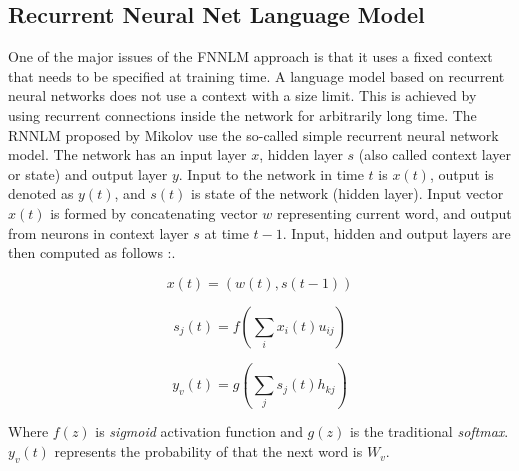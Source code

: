 

\subsection{Recurrent Neural Net Language Model}

One of the major issues of the \ac{FNNLM} approach is that
it uses a fixed context that needs to be specified at training time.
A language model based on recurrent neural networks  does not use a context
with a size limit. This is achieved by  using recurrent connections inside the network for arbitrarily long time. The \ac{RNNLM} proposed by
Mikolov use the so-called simple 
recurrent neural network model. The network has an input layer $x$, hidden
layer $s$ (also called context layer or state) and output layer $y$. Input to
the network in time $t$ is $x(t)$, output is denoted as $y(t)$, and $s(t)$ is
state of the network (hidden layer). Input vector $x(t)$ is formed by
concatenating vector $w$ representing current word, and output from neurons in
context layer $s$ at time $t - 1$. Input, hidden and output layers are then
computed as follows \cite{conf/interspeech/MikolovKBCK10}:.

\begin{equation} x(t) = (w(t), s(t-1))  \end{equation} 

\begin{equation} s_j(t) = f \left( \sum_{i}{x_i(t)u_{ij}}
  \right)   \end{equation}

\begin{equation}  y_v(t) = g \left( \sum_{j}{s_j(t)h_{kj}}
  \right)   \end{equation}


Where   $f(z)$ is \textit{sigmoid} activation function and $g(z)$  is the
traditional   \textit{softmax}.  $y_v(t)$ represents the probability of that
the next word is $W_v$.


